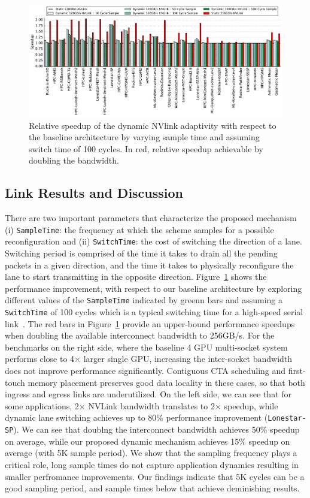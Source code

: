 \begin{figure}[tp]
    \centering
    \includegraphics[width=1.0\textwidth]{figures/plot_nvlink_sample_time.pdf}
    \caption{Relative speedup of the dynamic NVlink adaptivity with respect to
	the baseline architecture by varying sample time and assuming switch 
time of
	100 cycles. In red, relative speedup achievable by doubling the 
bandwidth.}
    \label{fig:sampletime}
\end{figure}

\subsection{Link Results and Discussion} 

There are two important parameters that characterize the proposed mechanism (i)
\texttt{SampleTime}: the frequency at which the scheme samples for a possible
reconfiguration and (ii) \texttt{SwitchTime}: the cost of switching the
direction of a lane. Switching period is comprised of the time it takes to
drain all the pending packets in a given direction, and the time it takes to
physically reconfigure the lane to start transmitting in the opposite
direction.  Figure~\ref{fig:sampletime} shows the performance improvement, with
respect to our baseline architecture by exploring different values of the
\texttt{SampleTime} indicated by greenn bars and assuming a \texttt{SwitchTime}
of 100 cycles which is a typical switching time for a high-speed serial
link~\cite{XXX}. The red bars in Figure~\ref{fig:sampletime} provide an
upper-bound performance speedups when doubling the available interconnect
bandwidth to 256GB/s. For the benchmarks on the right side, where the baseline
4 GPU multi-socket system performs close to 4$\times$ larger single GPU,
increasing the inter-socket bandwidth does not improve performance
significantly.  Contiguous CTA scheduling and first-touch memory placement
preserves good data locality in these cases, so that both ingress and egress
links are underutilized. On the left side, we can see that for some
applications, 2$\times$ NVLink bandwidth translates to 2$\times$ speedup, while
dynamic lane switching achieves up to 80\% performance improvement
(\texttt{Lonestar-SP}).  We can see that doublng the interconnect bandwidth
achieves 50\% speedup on average, while our proposed dynamic mechanism achieves
15\% speedup on average (with 5K sample period). We show that the sampling frequency
plays a critical role, long sample times do not capture application dynamics
resulting in smaller perfromance improvements. Our findings indicate that 5K
cycles can be a good sampling period, and sample times below that achieve
deminishing results.

